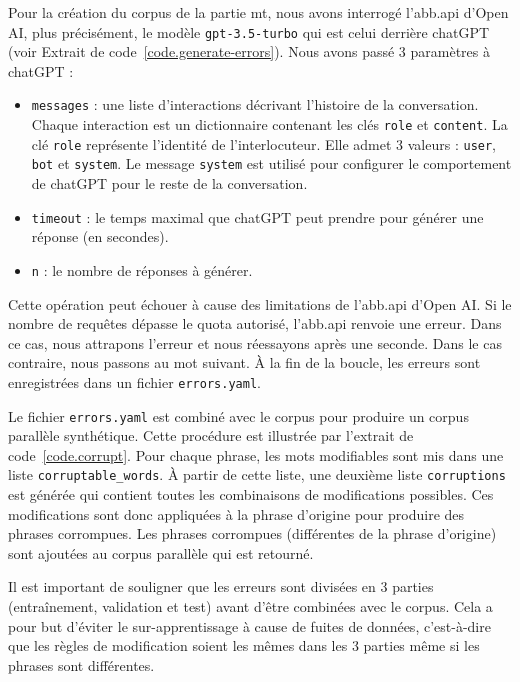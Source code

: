 Pour la création du corpus de la partie \gls{mt},
nous avons interrogé l'\gls{abb.api} d'\foreignlanguage{english}{Open AI}, 
plus précisément, le modèle \verb|gpt-3.5-turbo| qui est celui derrière chatGPT
(voir Extrait de code~\ref{code.generate-errors}).
Nous avons passé 3 paramètres à chatGPT :
\begin{itemize}
    \item \verb|messages| : une liste d'interactions décrivant l'histoire de la conversation.
    Chaque interaction est un dictionnaire contenant les clés \verb|role| et \verb|content|.
    La clé \verb|role| représente l'identité de l'interlocuteur.
    Elle admet 3 valeurs : \verb|user|, \verb|bot| et \verb|system|.
    Le message \verb|system| est utilisé pour configurer le comportement de chatGPT pour le reste de la conversation.
    \item \verb|timeout| : le temps maximal que chatGPT peut prendre pour générer une réponse (en secondes).
    \item \verb|n| : le nombre de réponses à générer.
\end{itemize}
Cette opération peut échouer à cause des limitations de l'\gls{abb.api} d'\foreignlanguage{english}{Open AI}.
Si le nombre de requêtes dépasse le quota autorisé, l'\gls{abb.api} renvoie une erreur.
Dans ce cas, nous attrapons l'erreur et nous réessayons après une seconde.
Dans le cas contraire, nous passons au mot suivant.
À la fin de la boucle, les erreurs sont enregistrées dans un fichier \verb|errors.yaml|.

Le fichier \verb|errors.yaml| est combiné avec le corpus pour produire un corpus parallèle synthétique.
Cette procédure est illustrée par l'extrait de code~\ref{code.corrupt}.
Pour chaque phrase, les mots modifiables sont mis dans une liste \verb|corruptable_words|.
À partir de cette liste, une deuxième liste \verb|corruptions| est générée qui contient 
toutes les combinaisons de modifications possibles.
Ces modifications sont donc appliquées à la phrase d'origine pour produire des phrases corrompues.
Les phrases corrompues (différentes de la phrase d'origine) sont ajoutées au corpus parallèle qui est retourné.

Il est important de souligner que les erreurs sont  divisées en 3 parties 
(entraînement, validation et test) avant d'être combinées avec le corpus.
Cela a pour but d'éviter le sur-apprentissage à cause de fuites de données,
c'est-à-dire que les règles de modification soient les mêmes dans les 3 parties
même si les phrases sont différentes.



